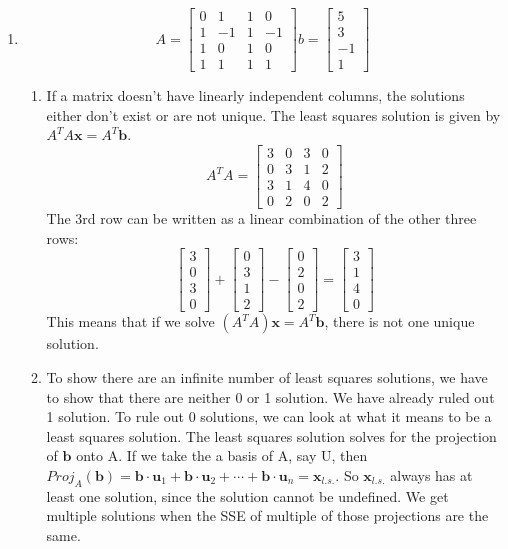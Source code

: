\documentclass{article}
\newcommand\tab[1][1cm]{\hspace*{#1}}
\begin{document}
\begin{enumerate}
\item
\tab $$A = \begin{bmatrix}0&1&1&0\\1&-1&1&-1\\1&0&1&0\\1&1&1&1\end{bmatrix}  b = \begin{bmatrix}5\\3\\-1\\1\end{bmatrix}$$
\begin{enumerate}
    \item If a matrix doesn't have linearly independent columns, the solutions either don't exist or are not unique. The least squares solution is given by $A^TA\textbf{x}=A^T \textbf{b}$.
    $$A^TA = \begin{bmatrix}3&0&3&0\\0&3&1&2\\3&1&4&0\\0&2&0&2\end{bmatrix}$$
    The 3rd row can be written as a linear combination of the other three rows:
    $$\begin{bmatrix}3\\0\\3\\0\end{bmatrix} + \begin{bmatrix}0\\3\\1\\2\end{bmatrix} - 
    \begin{bmatrix}0\\2\\0\\2\end{bmatrix} = 
    \begin{bmatrix}3\\1\\4\\0\end{bmatrix}$$
    This means that if we solve $(A^TA)\textbf{x} = A^T\textbf{b}$, there is not one unique solution.
    \item To show there are an infinite number of least squares solutions, we have to show that there are neither 0 or 1 solution. We have already ruled out 1 solution. To rule out 0 solutions, we can look at what it means to be a least squares solution. The least squares solution solves for the projection of $\textbf{b}$ onto A. If we take the a basis of A, say U, then $Proj_A(\textbf{b}) = \textbf{b}\cdot \textbf{u}_1 + \textbf{b}\cdot \textbf{u}_2 + \cdots + \textbf{b}\cdot \textbf{u}_n = \textbf{x}_{l.s.}$. So $\textbf{x}_{l.s.}$ always has at least one solution, since the solution cannot be undefined. We get multiple solutions when the SSE of multiple of those projections are the same.
\end{enumerate}
\par



\end{enumerate}
\end{document}
